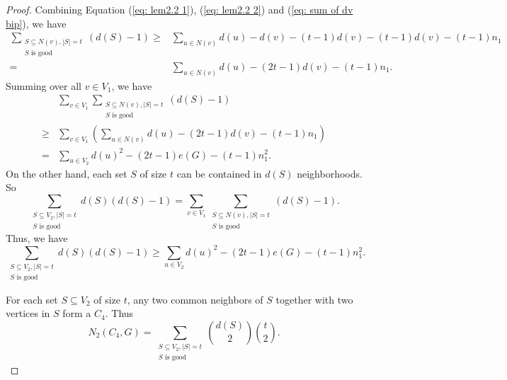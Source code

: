 \documentclass[11pt,a4paper]{article}
\theoremstyle{definition}
\begin{document}
\begin{proof}
            Combining Equation (\ref{eq: lem2.2 1}), (\ref{eq: lem2.2 2}) and (\ref{eq: sum of dv bip}), we have
            \begin{equation*}
                \begin{aligned}
                \sum_{\substack{S \subseteq N(v), |S| = t \\ S \text{ is good}}} (d(S) - 1)
                \geq& \sum_{u \in N(v)} d(u) - d(v) - (t-1) d(v) - (t-1) d(v) - (t-1) n_1 \\
                = & \sum_{u \in N(v)} d(u) - (2t-1) d(v) - (t-1) n_1.
                \end{aligned}
            \end{equation*}
            Summing over all $v \in V_1$, we have
            \begin{equation*}
                \begin{aligned}
                    & \sum_{v \in V_1} \sum_{\substack{S \subseteq N(v), |S| = t \\ S \text{ is good}}} (d(S) - 1) \\
                    \geq& \sum_{v \in V_1} \left(\sum_{u \in N(v)} d(u) - (2t-1) d(v) - (t-1) n_1 \right) \\
                    =& \sum_{u \in V_2} d(u)^2 - (2t-1) e(G) - (t-1) n_1^2.
                \end{aligned}
            \end{equation*}
            On the other hand, each set $S$ of size $t$ can be contained in $d(S)$ neighborhoods. So
            \begin{equation*}
                \sum_{\substack{S \subseteq V_2, |S| = t \\ S \text{ is good}}} d(S)(d(S) - 1) = \sum_{v \in V_1} \sum_{\substack{S \subseteq N(v), |S| = t \\ S \text{ is good}}} (d(S) - 1).
            \end{equation*}
            Thus, we have
            \begin{equation}\label{eq: lower bound of number of C4 1}
                \sum_{\substack{S \subseteq V_2, |S| = t \\ S \text{ is good}}} d(S)(d(S) - 1) \geq \sum_{u \in V_2} d(u)^2 - (2t-1) e(G) - (t-1) n_1^2.
            \end{equation}

            For each set $S \subseteq V_2$ of size $t$, any two common neighbors of $S$ together with two vertices in $S$ form a $C_4$.
            Thus
            \begin{equation}\label{eq: sum of dv 2}
                N_2 (C_4, G) = \sum_{\substack{S \subseteq V_2, |S| = t \\ S \text{ is good}}} \binom{d(S)}{2} \binom{t}{2}.
            \end{equation}


\end{proof}
\end{document}
